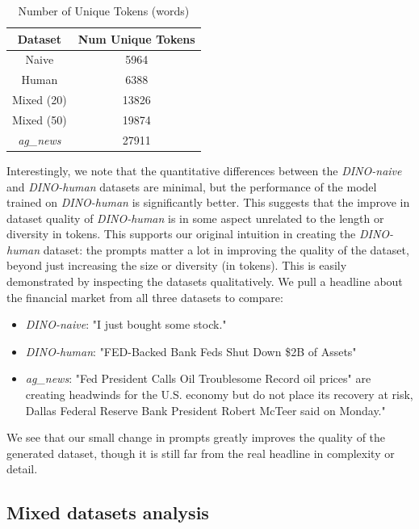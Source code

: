 \documentclass[11pt]{article}
\begin{document}
\begin{table}[h]
    \centering
    \begin{tabular}{c|c}
        Dataset & Num Unique Tokens \\ \hline
        Naive & 5964 \\ 
        Human & 6388 \\
        Mixed (20) & 13826 \\
        Mixed (50) & 19874 \\
        \textit{ag\_news} & 27911
    \end{tabular}
    \caption{Number of Unique Tokens (words)}
    \label{tab:unique_tokens}
\end{table}

Interestingly, we note that the quantitative differences between the \textit{DINO-naive} and \textit{DINO-human} datasets are minimal, but the performance of the model trained on \textit{DINO-human} is significantly better. This suggests that the improve in dataset quality of \textit{DINO-human} is in some aspect unrelated to the length or diversity in tokens. This supports our original intuition in creating the \textit{DINO-human} dataset: the prompts matter a lot in improving the quality of the dataset, beyond just increasing the size or diversity (in tokens). This is easily demonstrated by inspecting the datasets qualitatively. We pull a headline about the financial market from all three datasets to compare:

\begin{itemize}
    \item \textit{DINO-naive}: "I just bought some stock."
    \item \textit{DINO-human}: "FED-Backed Bank Feds Shut Down \$2B of Assets"
    \item \textit{ag\_news}: "Fed President Calls Oil Troublesome Record oil prices" are creating headwinds for the U.S. economy but do not place its recovery at risk, Dallas Federal Reserve Bank President Robert McTeer said on Monday."
\end{itemize}

We see that our small change in prompts greatly improves the quality of the generated dataset, though it is still far from the real headline in complexity or detail.


\subsection{Mixed datasets analysis}
\end{document}
